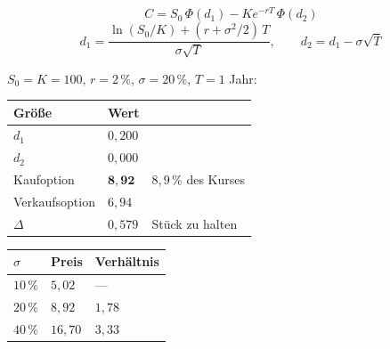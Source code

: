 \begin{merksatz}
\[ C = S_0\,\Phi(d_1) - K e^{-rT}\,\Phi(d_2) \]
\[ d_1 = \frac{\ln(S_0/K) + (r+\sigma^{2}/2)\,T}{\sigma\sqrt T}, \qquad d_2 = d_1 - \sigma\sqrt T \]

$S_0 = K = 100$, $r = 2\,\%$, $\sigma = 20\,\%$, $T = 1$ Jahr:

\begin{center}
{\small
\renewcommand{\arraystretch}{1.48}
\begin{tabular}{@{}P{2.4cm}P{2.2cm}P{2.8cm}@{}}
\toprule
\textbf{Größe} & \textbf{Wert} & \\
\midrule
$d_1$ & $0{,}200$ & \\
$d_2$ & $0{,}000$ & \\
Kaufoption & $\mathbf{8{,}92}$ & $8{,}9\,\%$ des Kurses\\
Verkaufsoption & $6{,}94$ & \\
$\Delta$ & $0{,}579$ & Stück zu halten\\
\bottomrule
\end{tabular}}
\end{center}

\begin{center}
{\small
\renewcommand{\arraystretch}{1.48}
\begin{tabular}{@{}P{2.0cm}P{2.2cm}P{2.6cm}@{}}
\toprule
$\sigma$ & \textbf{Preis} & \textbf{Verhältnis}\\
\midrule
$10\,\%$ & $5{,}02$ & ---\\
$20\,\%$ & $8{,}92$ & $1{,}78$\\
$40\,\%$ & $16{,}70$ & $3{,}33$\\
\bottomrule
\end{tabular}}
\end{center}

\begin{center}
\begin{minipage}{0.88\textwidth}
\end{minipage}
\end{center}
\end{merksatz}

